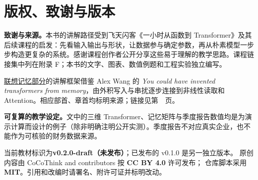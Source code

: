\section*{版权、致谢与版本}\label{front:colophon}
\textbf{致谢与来源。}本书的讲解路径受到飞天闪客《一小时从函数到 Transformer》及其后续课程的启发：先看输入输出与形状，让数据参与确定参数，再从朴素模型一步步构造更复杂的系统。感谢课程创作者公开分享这些易于理解的教学思路。课程链接集中列在附录 F；本书的文字、图表、数值例题和工程实验独立编写。

\hyperref[part:memory]{联想记忆部分}的讲解框架借鉴 Alex Wang 的 \emph{You could have invented transformers from memory}，由外积写入与串扰逐步连接到非线性读取和 Attention。相应部首、章首均标明来源；链接见第~\pageref{source:alex-wang}~页。

\textbf{可复算的教学设定。}文中的三维 Transformer、记忆矩阵与季度报告数值均是为演示计算而设计的例子（除非明确注明公开实测）。季度报告不对应真实企业，也不能作为可核验的财务数据来源。

当前教材标识为\textbf{v0.2.0-draft（未发布）}；已发布的 v0.1.0 是另一独立版本。
\bookbuildsource
原创内容由 CoCoThink and contributors 按 \textbf{CC BY 4.0} 许可发布；
仓库脚本采用 \textbf{MIT}。引用和改编时请署名、附许可证并标明改动。
